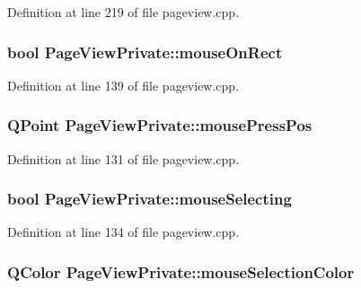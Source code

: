Definition at line 219 of file pageview.\+cpp.

\hypertarget{classPageViewPrivate_af6568bdd2ef97bb2c81a71961923ee4d}{
\subsubsection[{mouse\+On\+Rect}]{\setlength{\rightskip}{0pt plus 5cm}bool Page\+View\+Private\+::mouse\+On\+Rect}}\label{classPageViewPrivate_af6568bdd2ef97bb2c81a71961923ee4d}


Definition at line 139 of file pageview.\+cpp.

\hypertarget{classPageViewPrivate_aa4799ae3aa24957d19a95220d8f61216}{
\subsubsection[{mouse\+Press\+Pos}]{\setlength{\rightskip}{0pt plus 5cm}Q\+Point Page\+View\+Private\+::mouse\+Press\+Pos}}\label{classPageViewPrivate_aa4799ae3aa24957d19a95220d8f61216}


Definition at line 131 of file pageview.\+cpp.

\hypertarget{classPageViewPrivate_a8819b152a8279b75359af2a3e0567681}{
\subsubsection[{mouse\+Selecting}]{\setlength{\rightskip}{0pt plus 5cm}bool Page\+View\+Private\+::mouse\+Selecting}}\label{classPageViewPrivate_a8819b152a8279b75359af2a3e0567681}


Definition at line 134 of file pageview.\+cpp.

\hypertarget{classPageViewPrivate_ab09ba74cc55e9a99a5e7c0629dde8feb}{
\subsubsection[{mouse\+Selection\+Color}]{\setlength{\rightskip}{0pt plus 5cm}Q\+Color Page\+View\+Private\+::mouse\+Selection\+Color}}\label{classPageViewPrivate_ab09ba74cc55e9a99a5e7c0629dde8feb}


